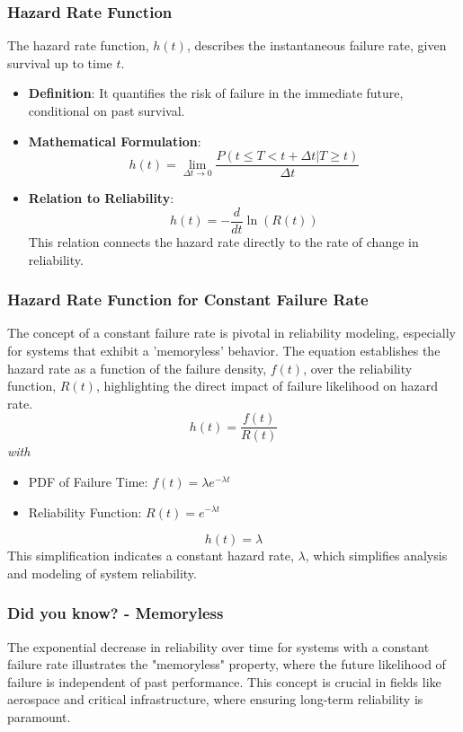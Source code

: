 \subsubsection*{Hazard Rate Function}
The hazard rate function, \( h(t) \), describes the instantaneous failure rate, given survival up to time \( t \).
\begin{itemize}
    \item \textbf{Definition}: It quantifies the risk of failure in the immediate future, conditional on past survival.
    \item \textbf{Mathematical Formulation}: 
        \[ h(t) = \lim_{\Delta t \to 0} \frac{P(t \leq T < t + \Delta t | T \geq t)}{\Delta t} \]
    \item \textbf{Relation to Reliability}: 
        \[ h(t) = -\frac{d}{dt} \ln(R(t)) \]
    This relation connects the hazard rate directly to the rate of change in reliability.
\end{itemize}

\subsubsection*{Hazard Rate Function for Constant Failure Rate}

The concept of a constant failure rate is pivotal in reliability modeling, especially for systems that exhibit a 'memoryless' behavior. The equation establishes the hazard rate as a function of the failure density, \( f(t) \), over the reliability function, \( R(t) \), highlighting the direct impact of failure likelihood on hazard rate.
\[ h(t) = \frac{f(t)}{R(t)} \]
\textit{with}
    \begin{itemize}
        \item PDF of Failure Time: \( f(t) = \lambda e^{-\lambda t} \)
        \item Reliability Function: \( R(t) = e^{-\lambda t} \)
    \end{itemize}
    \[ h(t) = \lambda \]
This simplification indicates a constant hazard rate, \( \lambda \), which simplifies analysis and modeling of system reliability.

\subsubsection*{Did you know? - Memoryless}
\begin{mdframed} [backgroundcolor=gray!20] 
    The exponential decrease in reliability over time for systems with a constant failure rate illustrates the "memoryless" property, where the future likelihood of failure is independent of past performance. This concept is crucial in fields like aerospace and critical infrastructure, where ensuring long-term reliability is paramount.
\end{mdframed}

